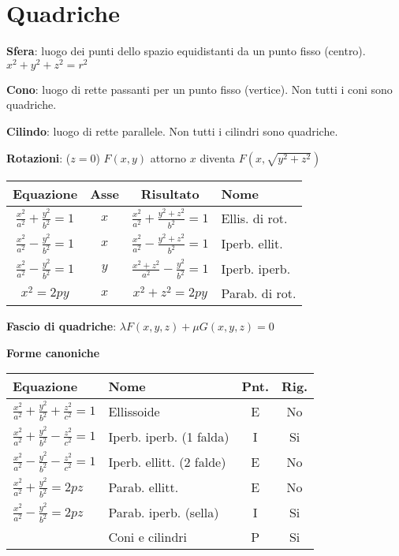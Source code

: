 \section{Quadriche}

\textbf{Sfera}: luogo dei punti dello spazio equidistanti da un punto fisso (centro). $x^2+y^2+z^2=r^2$

\textbf{Cono}: luogo di rette passanti per un punto fisso (vertice). Non tutti i coni sono quadriche.

\textbf{Cilindo}: luogo di rette parallele. Non tutti i cilindri sono quadriche.

\textbf{Rotazioni}: ($z = 0$) $F(x, y)$ attorno $x$ diventa $F(x, \sqrt{y^2+z^2})$

\begin{tabular}{cccl}
	\textbf{Equazione} & \textbf{Asse} & \textbf{Risultato} & \textbf{Nome} \\
	\hline
	$\frac{x^2}{a^2}+\frac{y^2}{b^2}=1$ & $x$ & $\frac{x^2}{a^2}+\frac{y^2+z^2}{b^2}=1$ & Ellis. di rot. \\
	$\frac{x^2}{a^2}-\frac{y^2}{b^2}=1$ & $x$ & $\frac{x^2}{a^2}-\frac{y^2+z^2}{b^2}=1$ & Iperb. ellit. \\
	$\frac{x^2}{a^2}-\frac{y^2}{b^2}=1$ & $y$ & $\frac{x^2+z^2}{a^2}-\frac{y^2}{b^2}=1$ & Iperb. iperb. \\
	$x^2=2py$ & $x$ & $x^2+z^2=2py$ & Parab. di rot.
\end{tabular}

\textbf{Fascio di quadriche}: $\lambda F(x, y, z) + \mu G(x, y, z) = 0$

\textbf{Forme canoniche}
\begin{tabular}{llcc}
	\textbf{Equazione} & \textbf{Nome} & \textbf{Pnt.} & \textbf{Rig.} \\
	\hline
	$\frac{x^2}{a^2} + \frac{y^2}{b^2} + \frac{z^2}{c^2} = 1$ & Ellissoide & E & No \\
	$\frac{x^2}{a^2} + \frac{y^2}{b^2} - \frac{z^2}{c^2} = 1$ & Iperb. iperb. (1 falda) & I & Si \\
	$\frac{x^2}{a^2} - \frac{y^2}{b^2} - \frac{z^2}{c^2} = 1$ & Iperb. ellitt. (2 falde) & E & No \\
	$\frac{x^2}{a^2} + \frac{y^2}{b^2} = 2pz$ & Parab. ellitt. & E & No \\
	$\frac{x^2}{a^2} - \frac{y^2}{b^2} = 2pz$ & Parab. iperb. (sella) & I & Si \\
	 & Coni e cilindri & P & Si \\
\end{tabular}

